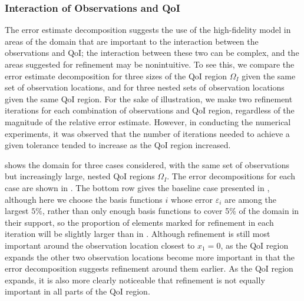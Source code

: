 \subsubsection{Interaction of Observations and QoI} \label{sec:qoivdata}
%
The error estimate decomposition suggests the use of the high-fidelity model in areas of the domain that are important to the interaction between the observations and QoI; the interaction between these two can be complex, and the areas suggested for refinement may be nonintuitive. To see this, we compare the error estimate decomposition for three sizes of the QoI region $\Omega_I$ given the same set of observation locations, and for three nested sets of observation locations given the same QoI region. For the sake of illustration, we make two refinement iterations for each combination of observations and QoI region, regardless of the magnitude of the relative error estimate. However, in conducting the numerical experiments, it was observed that the number of iterations needed to achieve a given tolerance tended to increase as the QoI region increased.

 shows the domain for three cases considered, with the same set of observations but increasingly large, nested QoI regions $\Omega_I$.
The error decompositions for each case are shown in . The bottom row gives the baseline case presented in , although here we choose the basis functions $i$ whose error $\varepsilon_i$ are among the largest $5\%$, rather than only enough basis functions to cover 5\% of the domain in their support, so the proportion of elements marked for refinement in each iteration will be slightly larger than in .
Although refinement is still most important around the observation location closest to $x_1=0$, as the QoI region expands the other two observation locations become more important in that the error decomposition suggests refinement around them earlier. As the QoI region expands, it is also more clearly noticeable that refinement is not equally important in all parts of the QoI region.

